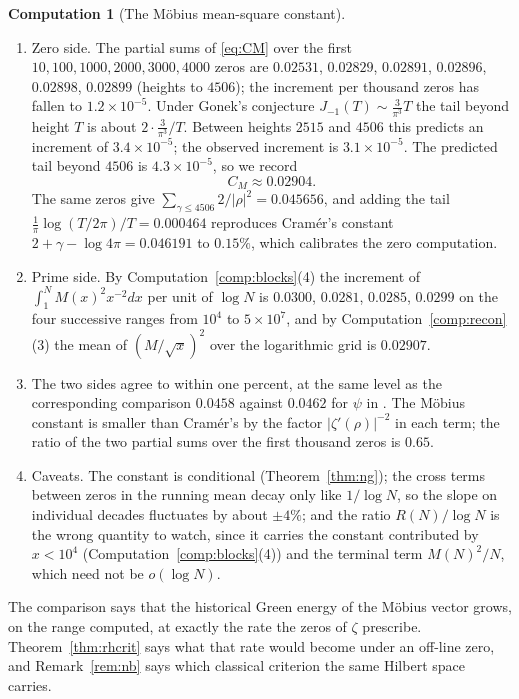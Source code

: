 \documentclass[11pt]{article}
\theoremstyle{definition}
\newtheorem{computation}[theorem]{Computation}
\theoremstyle{remark}
\begin{document}
\begin{computation}[The M\"obius mean-square constant]\label{comp:constant}
\begin{enumerate}[label=(\arabic*)]
\item Zero side. The partial sums of \eqref{eq:CM} over the first $10,100,1000,2000,3000,4000$ zeros are $0.02531$, $0.02829$, $0.02891$, $0.02896$, $0.02898$, $0.02899$ (heights to $4506$); the increment per thousand zeros has fallen to $1.2\times10^{-5}$. Under Gonek's conjecture $J_{-1}(T)\sim\frac3{\pi^3}T$ the tail beyond height $T$ is about $2\cdot\frac{3}{\pi^3}/T$. Between heights $2515$ and $4506$ this predicts an increment of $3.4\times10^{-5}$; the observed increment is $3.1\times10^{-5}$. The predicted tail beyond $4506$ is $4.3\times10^{-5}$, so we record
\[
C_M\approx0.02904.
\]
The same zeros give $\sum_{\gamma\le4506}2/|\rho|^2=0.045656$, and adding the tail $\frac1\pi\log(T/2\pi)/T=0.000464$ reproduces Cram\'er's constant $2+\gamma-\log4\pi=0.046191$ to $0.15\%$, which calibrates the zero computation.
\item Prime side. By Computation~\ref{comp:blocks}(4) the increment of $\int_1^N M(x)^2x^{-2}dx$ per unit of $\log N$ is $0.0300$, $0.0281$, $0.0285$, $0.0299$ on the four successive ranges from $10^4$ to $5\times10^7$, and by Computation~\ref{comp:recon}(3) the mean of $(M/\sqrt x)^2$ over the logarithmic grid is $0.02907$.
\item The two sides agree to within one percent, at the same level as the corresponding comparison $0.0458$ against $0.0462$ for $\psi$ in \cite[Computation 13.3]{michaels-folds}. The M\"obius constant is smaller than Cram\'er's by the factor $|\zeta'(\rho)|^{-2}$ in each term; the ratio of the two partial sums over the first thousand zeros is $0.65$.
\item Caveats. The constant is conditional (Theorem~\ref{thm:ng}); the cross terms between zeros in the running mean decay only like $1/\log N$, so the slope on individual decades fluctuates by about $\pm4\%$; and the ratio $R(N)/\log N$ is the wrong quantity to watch, since it carries the constant contributed by $x<10^4$ (Computation~\ref{comp:blocks}(4)) and the terminal term $M(N)^2/N$, which need not be $o(\log N)$.
\end{enumerate}
\end{computation}

The comparison says that the historical Green energy of the M\"obius vector grows, on the range computed, at exactly the rate the zeros of $\zeta$ prescribe. Theorem~\ref{thm:rhcrit} says what that rate would become under an off-line zero, and Remark~\ref{rem:nb} says which classical criterion the same Hilbert space carries.
\end{document}
